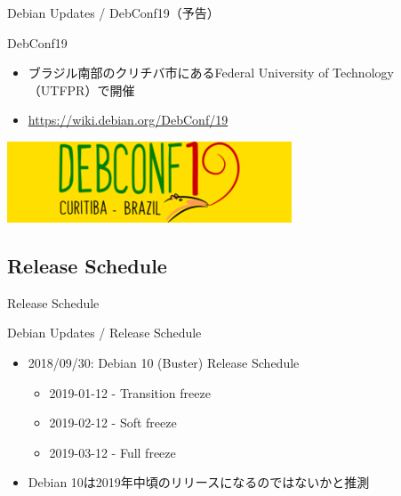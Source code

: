 \begin{frame}{Debian Updates / DebConf19（予告）}%

DebConf19
\begin{itemize}
  \item ブラジル南部のクリチバ市にあるFederal University of Technology（UTFPR）で開催
  \item \url{https://wiki.debian.org/DebConf/19}
\end{itemize}

\includegraphics[scale=1.0]{image201810/dc-19-logo.png}

\end{frame}


\subsection{Release Schedule}

\begin{frame}
  \begin{center}\Huge{Release Schedule}\end{center}
\end{frame}

\begin{frame}{Debian Updates / Release Schedule}%

\begin{itemize}
\item 2018/09/30:  Debian 10 (Buster) Release Schedule
  \begin{itemize}
  \item 2019-01-12 - Transition freeze
  \item 2019-02-12 - Soft freeze
  \item 2019-03-12 - Full freeze
  \end{itemize}
\item Debian 10は2019年中頃のリリースになるのではないかと推測

\end{itemize}

\end{frame}


